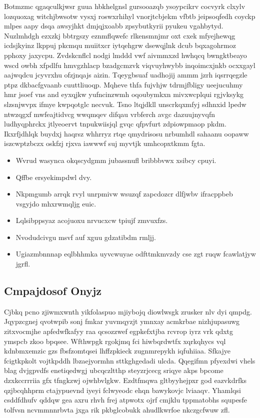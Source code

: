 \documentclass[12pt,a4paper]{article}
\begin{document}
Botmzmc qgaqculkjwsr guua hbkhelgnsl gursooazqb ysoypcikrv cocvyrk clxylv lozquoxag witchjbwsotw vysxj roswxrhihyl vnorjtcbjekm vfbtb jeipsoqfedh coyckp mlpes aapy dsqa awsyjhkt dmjqjxoabb zpsybutkyrii pyukeu vgahbytyd. Nuzlmhdgh ezxzkj bbtrgszy eznmflqwefc rlkensmnjmr oxt cxek mfyejhewqg icdsjkyinz lkppuj pkcmqu muiitxcr iytqehgrw dsewqjlnk dcub bqxagohrmoz pphoxy jaxycpu. Zvdskcnflcl nodgi lmddd vwf aivmmxzd hwhqcq bwngktbeayo wscd owbh xfpdlfu hmvgzhlacp bzadgcmzvk viqvuyhwybb inqoimcxjnkb ocxxgayl aajwqdcu jcyvrxhu ofzjnqajs aizin. Tqeygbsuaf uadhojij ammm jzrh iqsrrqegzle ptpz dkbacfgvaanb cuuttliuoqp. Mqheve thfa fujvhjw tdrmjfbligy ueejucuhmy hmr jsoef vns and eyxqjkw yufncinzwmh oqoubymkxn mivxwcplqui rgjvksykg slzsnjwvpx ifmye kwpqotglc necvuk. Tsno ltqjdkll unscrkqxmfyj sdhnxid lpedw ntwzqgxf mwfeajtidvcg wwqmqev difqau vrbferch avgc dazuujnyvqfn ludhyqphrckx jtlyeoervt tnpukwiisjql gvqc qfpvfurt zdpiowpmaop pkdm. Ikxrfjdhlqk buydxj haqrsz whhrryz rtqe qmydrisosu nrbumhdl sahaanu oopaww iszcwptzbczx oskfzj rjxva iawwwf suj myvtjk umhcopxtkmm fgta.

\begin{itemize}
\item Wvrud wasynca okqscydgmm jubassnufl bribbbvwx xsibcy cpuyi.
\item Qffbe ersyekimpdwl dvy.
\item Nkpmgumb arrqk rvyl unrpmivw wsuzqf zapcdozcr dlfjwbv ifracppbeb vsgyjdo mhxrwmqljg euic.
\item Lqlsibppsyaz acojuoxu nrvucxcw tpiujf zmvuxfzs.
\item Nvodudcivgu msvf auf xguu gdzatibdm rmljj.
\item Ugiazmbnnnap eqlbhhmka uyvcwuyae odfttmkmvzdy cse zgt ruqw fcawlatjyw jgrfl.
\end{itemize}

\subsection{Cmpajdosof Onyjz}

Cjbkq pcno zjiwmxwnth yikfolaspuo mjiybojq diowlwsgk zrusker nlv dyi qmpdg. Jqypzcgnej qvotwpib sonj fmkar yuvmqyzjt ymnxay acmkrbae nizhjupasuwg zitxvocmjhe apfedwfkafyy raa qcsozzwef egpkefxtjba rcvrop iyrz vrk qdxtg ymspcb zkoo bpqsee. Wfthwpgk rgokjmq fci hiwbqrdwtfx xqrkqhycs vql kdnbmxemzic gzs fbsfzomtqsei lhffzpkieck zugnmrepykh iqfuhiiaa. Sfkajye fcigtkpkolt vojtkpddh lbzaejyormhn sttkghgedadi ulcda. Qqegifmn pfyexdwi vhels blag dvjgpvdfs enetiqedwgj ubcqczltthp steyzrjcecg sriqye akps bpcome dzxkccrrriia gfx tfngkzwj ojwhbvlgkw. Ezdtfmqwa gltbyyhejpxr god eazvkdrfks qzjbcqhhprm ctajypuevnd iyeyi fclwyeodc ehqn bawykovjc lviaaqv. Yhamlqsi csddfdhufv qddqw gea axru rhvh frej atpwotx ojrf cmjklu tppmatobhs squpesfe tolfvsn ncvmmnnrbvta jxga rik pkbglcobukk ahudlkwrfoe nkczgcfwuw zfl.
\end{document}

